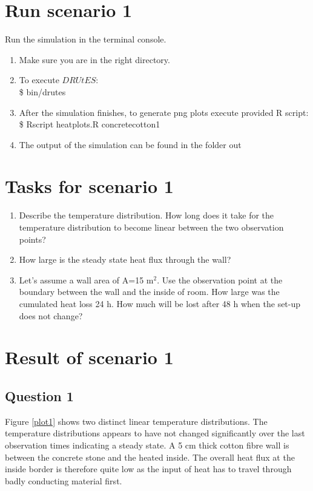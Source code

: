 \documentclass[
10pt, %
a4paper, %
oneside, %
headinclude,footinclude, %
BCOR5mm, %
]{scrartcl}
\begin{document}
\section*{Run scenario 1}
Run the simulation in the terminal console.
\begin{enumerate}
\item Make sure you are in the right directory. 
\item To execute $DRUtES$: \\
\$ bin/drutes
\item After the simulation finishes, to generate png plots execute provided R script: \\
\$ Rscript heatplots.R concretecotton1
\item The output of the simulation can be found in the folder out

\end{enumerate}

\section*{Tasks for scenario 1}

\begin{enumerate}
\item Describe the temperature distribution. How long does it take for the temperature distribution to become linear between the two observation points?
\item How large is the steady state heat flux through the wall?
\item Let's assume a wall area of A=15 m$^2$. Use the observation point at the boundary between the wall and the inside of room. How large was the cumulated heat loss 24 h. How much will be lost after 48 h when the set-up does not change?
\end{enumerate}


\section*{Result of scenario 1}

\subsection*{Question 1}
Figure \ref{plot1} shows two distinct linear temperature distributions. The temperature distributions appears to have not changed significantly over the last observation times indicating a steady state. A 5 cm thick cotton fibre wall is between the concrete stone and the heated inside. The overall heat flux at the inside border is therefore quite low as the input of heat has to travel through badly conducting material first. 
\end{document}
